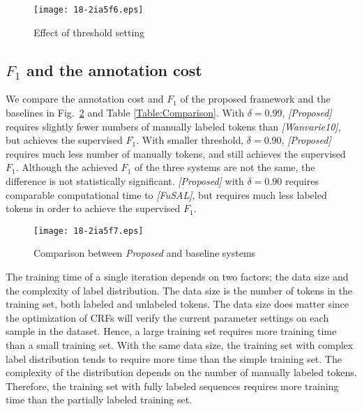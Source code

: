 \documentclass[english]{jnlp_JS2.0}
\begin{document}
\begin{figure}[b]
\begin{center}
\texttt{[image: 18-2ia5f6.eps]}
\end{center}
\caption{Effect of threshold setting}
\label{Fig:Threshold}
\end{figure}



\subsection{$F_1$ and the annotation cost}
\label{Cost}

We compare the annotation cost and $F_1$ of the proposed framework and the baselines in Fig.~\ref{Fig:Comparison} and Table \ref{Table:Comparison}. With $\delta=0.99$, \textit{[Proposed]} requires slightly fewer numbers of manually labeled tokens than \textit{[Wanvarie10]}, but achieves the supervised $F_1$. With smaller threshold, $\delta=0.90$, \textit{[Proposed]} requires much less number of manually tokens, and still achieves the supervised $F_1$. Although the achieved $F_1$ of the three systems are not the same, the difference is not statistically significant. \textit{[Proposed]} with $\delta=0.90$ requires comparable computational time to \textit{[FuSAL]}, but requires much less labeled tokens in order to achieve the supervised $F_1$.

\begin{figure}[t]
\begin{center}
\texttt{[image: 18-2ia5f7.eps]}
\end{center}
\caption{Comparison between \textit{Proposed} and baseline systems}
\label{Fig:Comparison}
\vspace{1\baselineskip}
\end{figure}
\begin{table}[t]
	\label{Table:Comparison}

\end{table}

The training time of a single iteration depends on two factors; the data size and the complexity of label distribution. The data size is the number of tokens in the training set, both labeled and unlabeled tokens. The data size does matter since the optimization of CRFs will verify the current parameter settings on each sample in the dataset. Hence, a large training set requires more training time than a small training set. With the same data size, the training set with complex label distribution tends to require more time than the simple training set. The complexity of the distribution depends on the number of manually labeled tokens. Therefore, the training set with fully labeled sequences requires more training time than the partially labeled training set.
\end{document}
